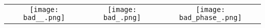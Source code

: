 \begin{tabular}{c @{\hskip 0pt} c @{\hskip 0pt} c }
    \texttt{[image: bad\_\_.png]}&
    \texttt{[image: bad\_.png]}&
    \texttt{[image: bad\_phase\_.png]}
\end{tabular}